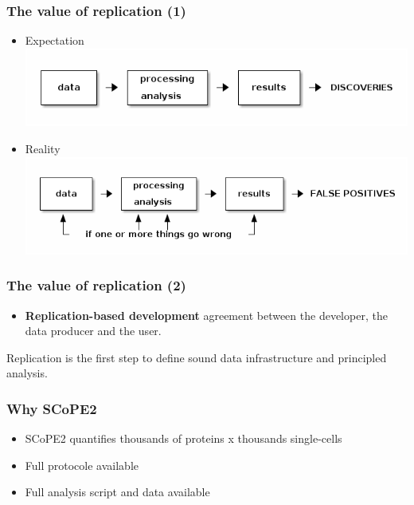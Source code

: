 \documentclass{beamer}
\newcommand{\frametitlesection}[1]{\frametitle{\centering #1 \footnotesize \hspace{0pt plus 1 filll} \insertsection}}
\begin{document}
\begin{frame}
  \frametitlesection{The value of replication (1)}

  \begin{itemize}
  \item<+-> Expectation
    \includegraphics[width=\linewidth]{figs/expectation.png}
  \item<+-> Reality
    \includegraphics[width=\linewidth]{figs/reality.png}
  \end{itemize}

\end{frame}

\begin{frame}
  \frametitlesection{The value of replication (2)}

  \begin{itemize}
  \item \textbf{Replication-based development} agreement between the
    developer, the data producer and the user.
  \end{itemize}


  \bigskip

  Replication is the first step to define sound data infrastructure
  and principled analysis.

\end{frame}

\begin{frame}
  \frametitlesection{Why SCoPE2}
    \begin{itemize}
        \item{SCoPE2 quantifies thousands of proteins x thousands single-cells}
        \item{Full protocole available}
        \item{Full analysis script and data available}
    \end{itemize}


\end{frame}
\end{document}
